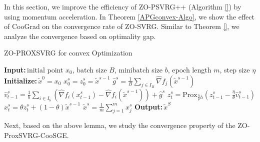\documentclass{article}
\newcommand*{\Po}{\text{Prox}}
\newcommand{\Initialize}{\textbf{Initialize:}{\,}}
\newcommand{\Input}{\textbf{Input:}{\,}}
\newcommand{\Output}{\textbf{Output:}{\,}}
\theoremstyle{definition}
\theoremstyle{remark}
\begin{document}
In this section, we improve the efficiency of ZO-PSVRG++ (Algorithm \ref{}) by using momentum acceleration.
In Theorem \ref{APGconvex-Algo}, we show the effect of CooGrad on the convergence rate of ZO-SVRG. Similar to
Theorem \ref{}, we analyze the convergence based on optimality gap.
\begin{algorithm}\label{APGconvex-Algo}
\caption{ZO-PROXSVRG for convex Optimization}\begin{algorithmic}[1]
\State\Input initial point $x_0$, batch size $B$, minibatch size $b$, epoch length $m$, step size $\eta$
\State\Initialize $\tilde{x}^0 = x_0$
\State $x_0^s = z_0^s = \widetilde{x}^{s-1}$
\State $\hat{g}^s = \frac{1}{B} \sum_{j\in I_B} \hat{\nabla} f_j (\widetilde{x}^{s-1})$
\State $\hat{v}_{t-1}^s = \frac{1}{b} \sum_{i\in I_b}\left(\hat{\nabla} f_{i}(x_{t-1}^s)-\hat{\nabla} f_{i}(\tilde{x}^{s-1})\right)+\hat{g}^s$
\State $z_{t}^s= \Po_{\frac{\eta}{\theta} h}(z_{t-1}^s - \frac{\eta}{\theta} \hat{v}_{t-1}^s)$
\State $x_{t}^s = \theta z_{t}^s+(1-\theta)\widetilde{x}^{s-1}$
\EndFor
\State $\tilde{x}^s=\frac{1}{m}\sum_{j=1}^{m}x_j^s$ 
 \EndFor
 \State\Output ${\tilde{x}}^{S}$
\end{algorithmic}
\end{algorithm}
{\color{Green}
Next, based on the above lemma, we study the convergence property of the ZO-ProxSVRG-CooSGE.
}
\end{document}
